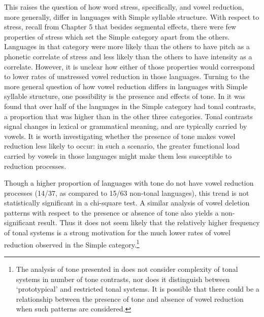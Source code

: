   This raises the question of how word stress, specifically, and vowel reduction, more generally, differ in languages with Simple syllable structure. With respect to stress, recall from Chapter 5 that besides segmental effects, there were few properties of stress which set the Simple category apart from the others. Languages in that category were more likely than the others to have pitch as a phonetic correlate of stress and less likely than the others to have intensity as a correlate. However, it is unclear how either of those properties would correspond to lower rates of unstressed vowel reduction in those languages. Turning to the more general question of how vowel reduction differs in languages with Simple syllable structure, one possibility is the presence and effects of tone. In  it was found that over half of the languages in the Simple category had tonal contrasts, a proportion that was higher than in the other three categories. Tonal contrasts signal changes in lexical or grammatical meaning, and are typically carried by vowels. It is worth investigating whether the presence of tone makes vowel reduction less likely to occur: in such a scenario, the greater functional load carried by vowels in those languages might make them less susceptible to reduction processes.



  Though a higher proportion of languages with tone do not have vowel reduction processes (14/37, as compared to 15/63 non-tonal languages), this trend is not statistically significant in a chi-square test. A similar analysis of vowel deletion patterns with respect to the presence or absence of tone also yields a non-significant result. Thus it does not seem likely that the relatively higher frequency of tonal systems is a strong motivation for the much lower rates of vowel reduction observed in the Simple category.\footnote{ \textrm{The analysis of tone presented in  does not consider complexity of tonal systems in number of tone contrasts,  nor does it distinguish between ‘prototypical’ and restricted tonal systems. It is possible that there could be a relationship between the presence of tone and absence of vowel reduction when such patterns are considered.}}



